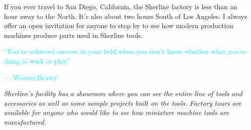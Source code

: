 
If you ever travel to San Diego, California, the Sherline factory is less than
an hour away to the North. It's also about two hours South of Los Angeles. I
always offer an open invitation for anyone to stop by to see how modern
production machines produce parts used in Sherline tools.

\bigskip
\textcolor{Cyan}{``You've achieved success in your field when you don't know
whether what you're doing is work or play.''}

\bigskip
\textcolor{Cyan}{--- Warren Beatty}
\bigskip

\bigskip\textit{Sherline's facility has a showroom where you can see the entire
line of tools and accessories as well as some sample projects built on the
tools. Factory tours are available for anyone who would like to see how
miniature machine tools are manufactured.}\bigskip

\secup
\secup
